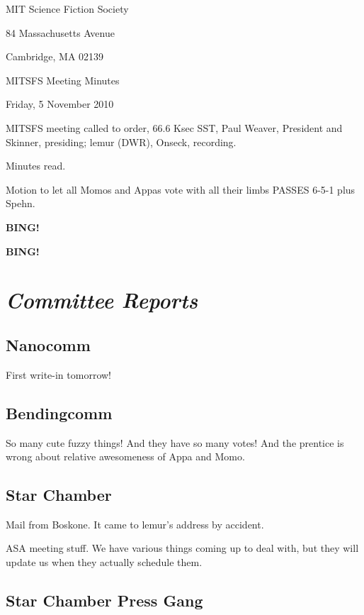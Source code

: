 \documentclass[10pt]{article}
\newcommand{\bing}{{\bf BING!} }
\newcommand{\goto}[1]{\bing \vskip 12pt \section*{{\em{#1}}}}
\newcommand{\ps}{ plus Spehn\xspace}
\newcommand{\skinner}{Paul Weaver, President and Skinner}
\newcommand{\onseck}{lemur (DWR), Onseck}
\newcommand{\meetingdate}{Friday, 5 November 2010}
\begin{document}
\begin{center}

MIT Science Fiction Society

84 Massachusetts Avenue

Cambridge, MA 02139

\vspace{12pt}

MITSFS Meeting Minutes

\meetingdate

\end{center}

\vspace{18pt}

\setlength{\parskip}{6pt}

\noindent
MITSFS meeting called to order, 66.6 Ksec SST,
\skinner, presiding; \onseck, recording.

Minutes read.

Motion to let all Momos and Appas vote with all their limbs
PASSES 6-5-1\ps.

\bing

\goto{Committee Reports}

\subsection*{Nanocomm}

First write-in tomorrow!

\subsection*{Bendingcomm}

So many cute fuzzy things!  And they have so many votes!
And the prentice is wrong about relative awesomeness of
Appa and Momo.

\subsection*{Star Chamber}

Mail from Boskone.  It came to lemur's address by accident.

ASA meeting stuff.  We have various things coming up to deal with, but
they will update us when they actually schedule them.

\subsection*{Star Chamber Press Gang}
\end{document}
